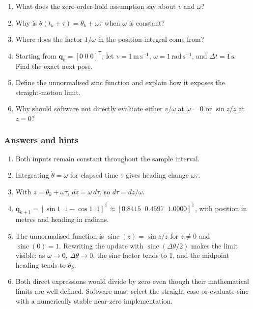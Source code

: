 \documentclass[
  australian,
  12pt,
  letterpaper,
  DIV=11,
  numbers=noendperiod,
  twoside]{scrreprt}
\providecommand{\tightlist}{%
  \setlength{\itemsep}{0pt}\setlength{\parskip}{0pt}}
\begin{document}
\begin{enumerate}
\def\labelenumi{\arabic{enumi}.}
\tightlist
\item
  What does the zero-order-hold assumption say about \(v\) and
  \(\omega\)?
\item
  Why is \(\theta(t_k+\tau)=\theta_k+\omega\tau\) when \(\omega\) is
  constant?
\item
  Where does the factor \(1/\omega\) in the position integral come from?
\item
  Starting from \(\mathbf q_k=[0\;0\;0]^\mathsf T\), let
  \(v=1\,\mathrm{m\,s^{-1}}\), \(\omega=1\,\mathrm{rad\,s^{-1}}\), and
  \(\Delta t=1\,\mathrm s\). Find the exact next pose.
\item
  Define the unnormalised sinc function and explain how it exposes the
  straight-motion limit.
\item
  Why should software not directly evaluate either \(v/\omega\) at
  \(\omega=0\) or \(\sin z/z\) at \(z=0\)?
\end{enumerate}

\subsubsection*{Answers and hints}\label{answers-and-hints-8}

\begin{enumerate}
\def\labelenumi{\arabic{enumi}.}
\tightlist
\item
  Both inputs remain constant throughout the sample interval.
\item
  Integrating \(\dot\theta=\omega\) for elapsed time \(\tau\) gives
  heading change \(\omega\tau\).
\item
  With \(z=\theta_k+\omega\tau\), \(dz=\omega\,d\tau\), so
  \(d\tau=dz/\omega\).
\item
  \(\mathbf q_{k+1}=[\sin1\;\;1-\cos1\;\;1]^\mathsf T\approx[0.8415\;\;0.4597\;\;1.0000]^\mathsf T\),
  with position in metres and heading in radians.
\item
  The unnormalised function is \(\operatorname{sinc}(z)=\sin z/z\) for
  \(z\neq0\) and \(\operatorname{sinc}(0)=1\). Rewriting the update with
  \(\operatorname{sinc}(\Delta\theta/2)\) makes the limit visible: as
  \(\omega\to0\), \(\Delta\theta\to0\), the sinc factor tends to \(1\),
  and the midpoint heading tends to \(\theta_k\).
\item
  Both direct expressions would divide by zero even though their
  mathematical limits are well defined. Software must select the
  straight case or evaluate sinc with a numerically stable near-zero
  implementation.
\end{enumerate}
\end{document}
